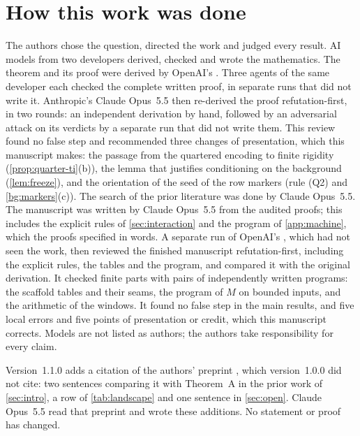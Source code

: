 \section*{How this work was done}

The authors chose the question, directed the work and judged every result. AI models from two developers derived, checked and wrote the mathematics. The theorem and its proof were derived by OpenAI's \OPENAIMODEL{}. Three agents of the same developer each checked the complete written proof, in separate runs that did not write it. Anthropic's Claude Opus~5.5 then re-derived the proof refutation-first, in two rounds: an independent derivation by hand, followed by an adversarial attack on its verdicts by a separate run that did not write them. This review found no false step and recommended three changes of presentation, which this manuscript makes: the passage from the quartered encoding to finite rigidity (\cref{prop:quarter-ti}(b)), the lemma that justifies conditioning on the background (\cref{lem:freeze}), and the orientation of the seed of the row markers (rule (Q2) and \cref{bg:markers}(c)). The search of the prior literature was done by Claude Opus~5.5. The manuscript was written by Claude Opus~5.5 from the audited proofs; this includes the explicit rules of \cref{sec:interaction} and the program of \cref{app:machine}, which the proofs specified in words. A separate run of OpenAI's \OPENAIMODEL{}, which had not seen the work, then reviewed the finished manuscript refutation-first, including the explicit rules, the tables and the program, and compared it with the original derivation. It checked finite parts with pairs of independently written programs: the scaffold tables and their seams, the program of $M$ on bounded inputs, and the arithmetic of the windows. It found no false step in the main results, and five local errors and five points of presentation or credit, which this manuscript corrects. Models are not listed as authors; the authors take responsibility for every claim.

Version~1.1.0 adds a citation of the authors' preprint \cite{DM26thermal}, which version~1.0.0 did not cite: two sentences comparing it with Theorem~A in the prior work of \cref{sec:intro}, a row of \cref{tab:landscape} and one sentence in \cref{sec:open}. Claude Opus~5.5 read that preprint and wrote these additions. No statement or proof has changed.


